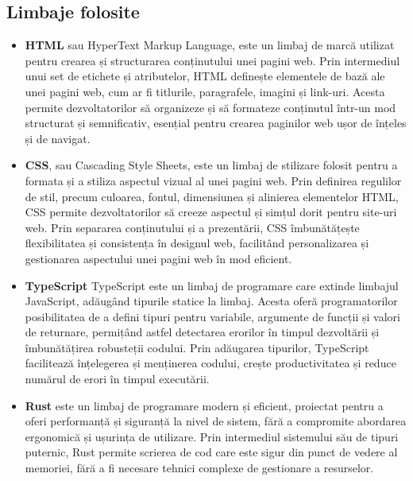 \newpage
\begin{center}
	\section{Limbaje folosite}
\end{center}
\vspace{2cm}

\begin{itemize}
	\item \textbf{HTML} sau HyperText Markup Language, este un limbaj de marcă utilizat
	      pentru crearea și structurarea conținutului unei pagini web. Prin intermediul
	      unui set de etichete și atributelor, HTML definește elementele de bază ale unei
	      pagini web, cum ar fi titlurile, paragrafele, imagini și link-uri. Acesta permite
	      dezvoltatorilor să organizeze și să formateze conținutul într-un mod structurat
	      și semnificativ, esențial pentru crearea paginilor web ușor de înțeles și de navigat.
	\item \textbf{CSS}, sau Cascading Style Sheets, este un limbaj de stilizare folosit
	      pentru a formata și a stiliza aspectul vizual al unei pagini web. Prin definirea
	      regulilor de stil, precum culoarea, fontul, dimensiunea și alinierea elementelor
	      HTML, CSS permite dezvoltatorilor să creeze aspectul și simțul dorit pentru
	      site-uri web. Prin separarea conținutului și a prezentării, CSS îmbunătățește
	      flexibilitatea și consistența în designul web, facilitând personalizarea și
	      gestionarea aspectului unei pagini web în mod eficient.
	\item \textbf{TypeScript} TypeScript este un limbaj de programare care extinde limbajul
	      JavaScript, adăugând tipurile statice la limbaj. Acesta oferă programatorilor
	      posibilitatea de a defini tipuri pentru variabile, argumente de funcții și
	      valori de returnare, permițând astfel detectarea erorilor în timpul dezvoltării
	      și îmbunătățirea robusteții codului. Prin adăugarea tipurilor, TypeScript
	      facilitează înțelegerea și menținerea codului, crește productivitatea și
	      reduce numărul de erori în timpul executării.

	\item \textbf{Rust} este un limbaj de programare modern și eficient, proiectat
	      pentru a oferi performanță și siguranță la nivel de sistem, fără a compromite
	      abordarea ergonomică și ușurința de utilizare. Prin intermediul sistemului
	      său de tipuri puternic, Rust permite scrierea de cod care este sigur din
	      punct de vedere al memoriei, fără a fi necesare tehnici complexe de
	      gestionare a resurselor.


\end{itemize}
